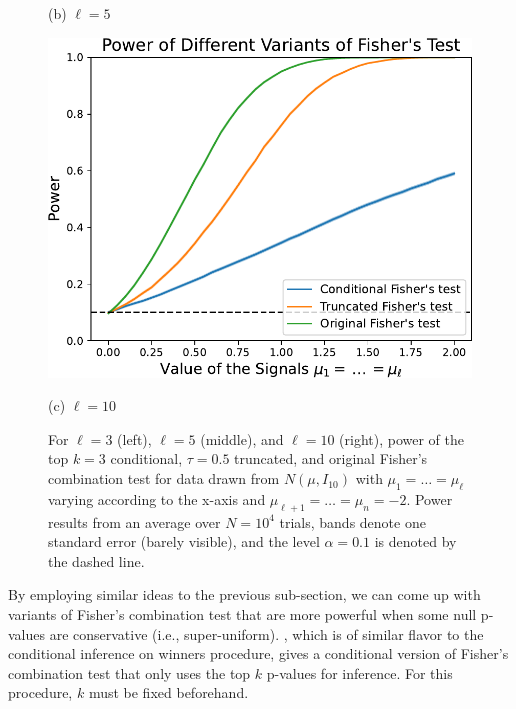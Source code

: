 \documentclass{article}
\begin{document}
\begin{figure}
\begin{minipage}{0.32\textwidth}
        \caption*{(b) $\ell=5$}
    \end{minipage}
    \hfill
    \hspace{0.01\textwidth}
    \begin{minipage}{0.32\textwidth}
        \centering
        \includegraphics[width=\textwidth]{fig/fisher_ell=10.pdf}
        \caption*{(c) $\ell=10$}
    \end{minipage}
    \caption{ For $\ell=3$ (left), $\ell=5$ (middle), and $\ell=10$ (right), power of the top $k=3$ conditional, $\tau=0.5$ truncated, and original Fisher's combination test for data drawn from $N(\mu, I_{10})$ with $\mu_{1}= \dots = \mu_{\ell}$ varying according to the x-axis and $\mu_{\ell + 1} = \dots = \mu_n = -2$. Power results from an average over $N=10^4$ trials, bands denote one standard error (barely visible), and the level $\alpha=0.1$ is denoted by the dashed line.}
    \label{fig:fisher}
\end{figure}

By employing similar ideas to the previous sub-section, we can come up with variants of Fisher's combination test that are more powerful when some null p-values are conservative (i.e., super-uniform). , which is of similar flavor to the conditional inference on winners procedure, gives a conditional version of Fisher's combination test that only uses the top $k$ p-values for inference. For this procedure, $k$ must be fixed beforehand. 
\end{document}

